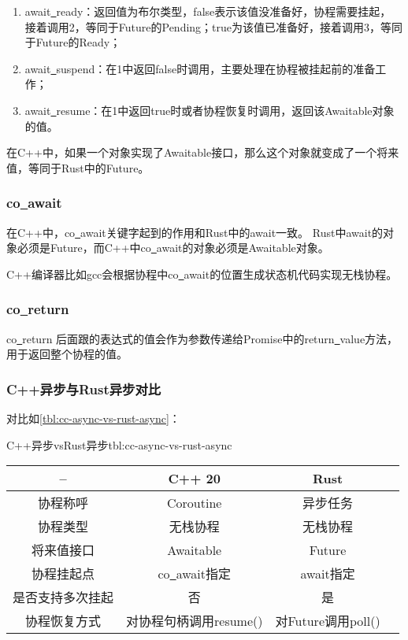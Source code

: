 \documentclass[supercite]{HustGraduPaper}
\newcommand{\rtbl}[1]{\autoref{tbl:#1}}
\theoremstyle{definition}
\begin{document}
\begin{enumerate}[label={(\arabic*)}]
  \item await\underline{~}ready：返回值为布尔类型，false表示该值没准备好，协程需要挂起，
    接着调用2，等同于Future的Pending；true为该值已准备好，接着调用3，等同于Future的Ready；
  \item await\underline{~}suspend：在1中返回false时调用，主要处理在协程被挂起前的准备工作；
  \item await\underline{~}resume：在1中返回true时或者协程恢复时调用，返回该Awaitable对象的值。
\end{enumerate}

在C++中，如果一个对象实现了Awaitable接口，那么这个对象就变成了一个将来值，等同于Rust中的Future。\par

\subsubsection{co\underline{~}await}
在C++中，co\underline{~}await关键字起到的作用和Rust中的await一致。
Rust中await的对象必须是Future，而C++中co\underline{~}await的对象必须是Awaitable对象。\par

C++编译器比如gcc会根据协程中co\underline{~}await的位置生成状态机代码实现无栈协程。\par

\subsubsection{co\underline{~}return}

co\underline{~}return 后面跟的表达式的值会作为参数传递给Promise中的return\underline{~}value方法，
用于返回整个协程的值。\par

\subsubsection{C++异步与Rust异步对比}
对比如\rtbl{cc-async-vs-rust-async}：

\begin{generaltab}{C++异步vsRust异步}{tbl:cc-async-vs-rust-async}
  \begin{tabular}{c|ccc}
    \toprule
    -- & C++ 20 & Rust \\
    \midrule
    协程称呼 & Coroutine & 异步任务 \\
    协程类型 & 无栈协程 & 无栈协程 \\
    将来值接口 & Awaitable & Future \\
    协程挂起点 & co\underline{~}await指定 & await指定 \\
    是否支持多次挂起 & 否 & 是 \\
    协程恢复方式 & 对协程句柄调用resume() & 对Future调用poll() \\
    \bottomrule
  \end{tabular}
\end{generaltab}
\end{document}
